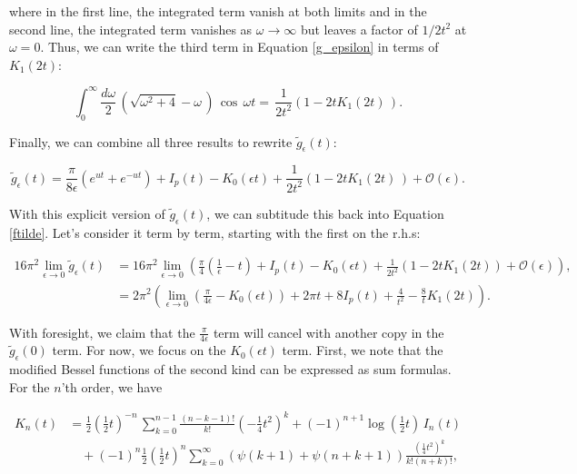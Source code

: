 \documentclass{article}
\numberwithin{equation}{section} %
\begin{document}
\noindent where in the first line, the integrated term vanish at both limits and in the second line, the integrated term vanishes as $\omega\rightarrow \infty$ but leaves a factor of $1/2t^2$ at $\omega=0$. Thus, we can write the third term in Equation \ref{g_epsilon} in terms of $K_1(2t)$:

\begin{equation}
\int^\infty_0 \frac{d\omega}{2}\, \left(\sqrt{\omega^2 + 4} - \omega\,\right)\, \cos \, \omega t  = \,\frac{1}{2t^2}( 1 - 2tK_1(2t)\,).
\end{equation}

Finally, we can combine all three results to rewrite $\tilde{g}_\epsilon(t)$:

\begin{equation}
\tilde{g}_\epsilon(t) = \frac{\pi}{8\epsilon}(e^{ut}+e^{-ut}) + I_p(t) -  K_0(\epsilon t) + \frac{1}{2t^2}( 1 - 2tK_1(2t)\,) + \mathcal{O}(\epsilon).
\end{equation}

With this explicit version of $\tilde{g}_\epsilon(t)$, we can subtitude this back into Equation \ref{ftilde}. Let's consider it term by term, starting with the first on the r.h.s:

\begin{equation}
\begin{split}
16\pi^2\lim_{\epsilon \rightarrow 0} \tilde{g}_\epsilon(t) &= 16\pi^2 \lim_{\epsilon\rightarrow 0} \left( \frac{\pi}{4}(\frac{1}{\epsilon}-t) + I_p(t) - K_0(\epsilon t) + \frac{1}{2t^2}(1-2tK_1(2t)) + \mathcal{O}(\epsilon) \right),\\
&= 2\pi^2 \left( \lim_{\epsilon\rightarrow 0} \left( \frac{\pi}{4\epsilon} - K_0(\epsilon t)\right) + 2\pi t + 8I_p(t)  + \frac{4}{t^2} - \frac{8}{t}K_1(2t) \right).
\end{split}
\label{lim 1}
\end{equation}

\noindent With foresight, we claim that the $\frac{\pi}{4\epsilon}$ term will cancel with another copy in the $\tilde{g}_\epsilon(0)$ term. For now, we focus on the $K_0(\epsilon t)$ term. First, we note that the modified Bessel functions of the second kind can be expressed as sum formulas\cite{bessel}. For the $n$'th order, we have

\begin{equation}
\begin{split}
K_n(t) &= \frac{1}{2}\left(\frac{1}{2}t\right)^{-n} \, \sum^{n-1}_{k=0}\frac{(n-k-1)!}{k!}(-\frac{1}{4}t^2)^k + (-1)^{n+1} \log(\frac{1}{2}t)\, I_n(t) \\
& \quad + (-1)^n\frac{1}{2}\left(\frac{1}{2}t\right)^n\sum^\infty_{k=0}\left( \psi(k+1) + \psi(n+k+1) \right)\frac{(\frac{1}{4}t^2)^k}{k!(n+k)!},
\end{split}
\end{equation}
\end{document}
